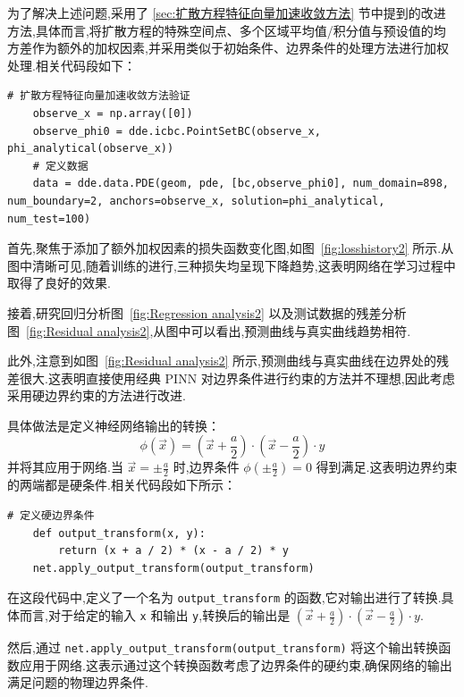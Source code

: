 \documentclass{Sichuan Normal University}
\begin{document}
    为了解决上述问题,采用了 \ref{sec:扩散方程特征向量加速收敛方法} 节中提到的改进方法,具体而言,将扩散方程的特殊空间点、多个区域平均值/积分值与预设值的均方差作为额外的加权因素,并采用类似于初始条件、边界条件的处理方法进行加权处理.相关代码段如下：
\begin{lstlisting}[style=python,basicstyle=\footnotesize\fontspec{Courier New},]  
    # 扩散方程特征向量加速收敛方法验证
    observe_x = np.array([0])
    observe_phi0 = dde.icbc.PointSetBC(observe_x, phi_analytical(observe_x))
    # 定义数据
    data = dde.data.PDE(geom, pde, [bc,observe_phi0], num_domain=898, num_boundary=2, anchors=observe_x, solution=phi_analytical, num_test=100)
\end{lstlisting}
首先,聚焦于添加了额外加权因素的损失函数变化图,如图~\ref{fig:losshistory2} 所示.从图中清晰可见,随着训练的进行,三种损失均呈现下降趋势,这表明网络在学习过程中取得了良好的效果.

接着,研究回归分析图~\ref{fig:Regression analysis2} 以及测试数据的残差分析图~\ref{fig:Residual analysis2},从图中可以看出,预测曲线与真实曲线趋势相符.

此外,注意到如图~\ref{fig:Residual analysis2} 所示,预测曲线与真实曲线在边界处的残差很大.这表明直接使用经典 PINN 对边界条件进行约束的方法并不理想,因此考虑采用硬边界约束的方法进行改进.

具体做法是定义神经网络输出的转换：
\begin{equation}
    \phi(\vec{x})=(\vec{x}+\frac{a}{2}) \cdot(\vec{x}-\frac{a}{2}) \cdot y
\end{equation}
并将其应用于网络.当 $\vec{x}=\pm \frac{a}{2}$ 时,边界条件 $\phi(\pm \frac{a}{2})=0$ 得到满足.这表明边界约束的两端都是硬条件.相关代码段如下所示：

\begin{lstlisting}[style=python,basicstyle=\footnotesize\fontspec{Courier New},]  
    # 定义硬边界条件
    def output_transform(x, y):
        return (x + a / 2) * (x - a / 2) * y
    net.apply_output_transform(output_transform)
\end{lstlisting}

在这段代码中,定义了一个名为 \texttt{output\_transform} 的函数,它对输出进行了转换.具体而言,对于给定的输入 \texttt{x} 和输出 \texttt{y},转换后的输出是 $(\vec{x}+\frac{a}{2}) \cdot(\vec{x}-\frac{a}{2}) \cdot y$.

然后,通过 \texttt{net.apply\_output\_transform(output\_transform)} 将这个输出转换函数应用于网络.这表示通过这个转换函数考虑了边界条件的硬约束,确保网络的输出满足问题的物理边界条件.
\end{document}

